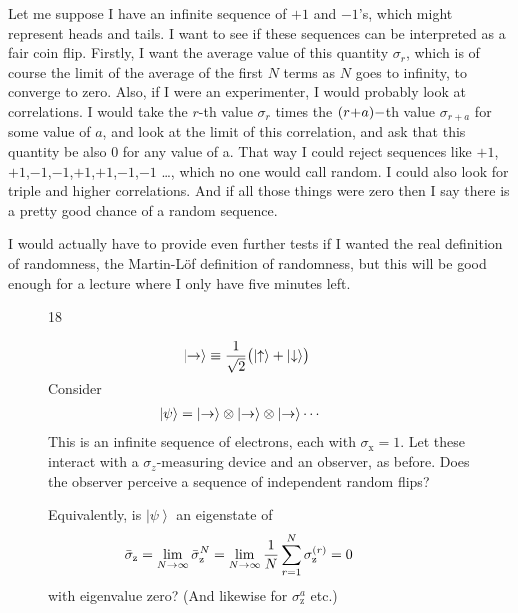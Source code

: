\documentclass[twocolumn,prb]{revtex4}
\newcommand{\ket}[1]{\left|#1\right\rangle}
\newcommand{\x}{\text{x}}
\newcommand{\z}{\text{z}}
\newcommand{\up}{\uparrow}
\newcommand{\dw}{\downarrow}
\begin{document}
Let me suppose I have an infinite sequence of $+1$ and $-1$'s, which might represent heads and tails. I want to see if these sequences can be interpreted as a fair coin flip. Firstly, I want the average value of this quantity $\sigma_r$, which is of course the limit of the average of the first $N$ terms  as $N$ goes to infinity, to converge to zero. Also, if I were an experimenter, I would probably look at correlations. I would take
the $r$-th value $\sigma_r$ times the $(r\hspace{-2pt}+\hspace{-2pt}a)-$th value $\sigma_{r+a}$ for some value of $a$, and look at the limit of this correlation, and ask that this quantity be also 0 for any value of a. That way I could reject sequences like $+1$,$+1$,$-1$,$-1$,$+1$,$+1$,$-1$,$-1$ \ldots, which no one would call random.  I could also look for triple and higher correlations. And if all those things were zero then I say there is a pretty good chance of a random sequence.

I would actually have to provide even further tests if I wanted the real definition of randomness, the Martin-L\"of definition of randomness\cite{martin-lof66ic602}, but this will be good enough for a lecture where I only have five minutes left.

\begin{figure}[htb] 
\begin{mdframed}
  \vspace{5pt}\hfill 18\\[-18pt]
  \begin{raggedright}
  \begin{align}\nonumber
    &\hspace{-20pt}
      \ket{\to }\equiv
      \frac{1}{\sqrt{2}}\bigl(\ket{\up}+\ket{\dw}\bigr)      
      \\[-18pt]\nonumber
  \end{align}
  Consider
  \begin{align}\nonumber
    &\hspace{-20pt}
     \ket{\psi}
      =\ket{\to}\otimes\ket{\to}\otimes\ket{\to}\cdots      
  \end{align}
  This is an infinite sequence of electrons, each with $\sigma_\x=1$. Let these interact with a $\sigma_z$-measuring device and an observer, as before.  Does the observer perceive a sequence of independent random flips?

  Equivalently, is $\ket{\psi}$ an eigenstate of
  \begin{align}\nonumber
    &\hspace{-20pt}
      \bar\sigma_\z =\lim_{N\to\infty}\bar\sigma_\z^N=
      \lim_{N\to\infty}\frac{1}{N}\sum_{r=1}^N\sigma_\z^{(r)}=0
  \end{align}
  with eigenvalue zero?  (And likewise for $\sigma_\z^a$ etc.)
  \end{raggedright}
\vspace{.5\baselineskip}
\end{mdframed}
\end{figure}
\end{document}
